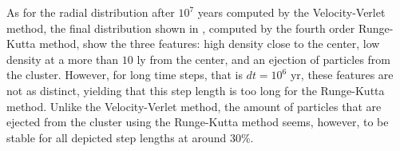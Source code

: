 As for the radial distribution after $10^7$ years computed by the Velocity-Verlet method, the final distribution shown in , computed by the fourth order Runge-Kutta method, show the three features: high density close to the center, low density at a more than $10$ ly from the center, and an ejection of particles from the cluster.
However, for long time steps, that is $dt = 10^6$ yr, these features are not as distinct, yielding that this step length is too long for the Runge-Kutta method. 
Unlike the Velocity-Verlet method, the amount of particles that are ejected from the cluster using the Runge-Kutta method seems, however, to be stable for all depicted step lengths at around $30 \%$. 